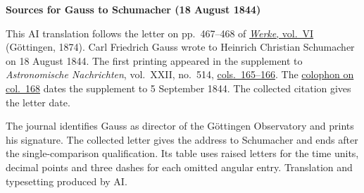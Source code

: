 \clearpage\thispagestyle{empty}
\begin{center}\textbf{Sources for Gauss to Schumacher (18 August 1844)}\end{center}
\noindent This AI translation follows the letter on pp.~467--468 of \href{https://gdz.sub.uni-goettingen.de/id/PPN236007467}{\textit{Werke}, vol.~VI} (Göttingen, 1874). Carl Friedrich Gauss wrote to Heinrich Christian Schumacher on 18 August 1844. The first printing appeared in the supplement to \textit{Astronomische Nachrichten}, vol.~XXII, no.~514, \href{https://api.digitale-sammlungen.de/iiif/image/v2/bsb10049447_00091/full/1800,/0/default.jpg}{cols.~165--166}. The \href{https://api.digitale-sammlungen.de/iiif/image/v2/bsb10049447_00092/full/1800,/0/default.jpg}{colophon on col.~168} dates the supplement to 5 September 1844. The collected citation gives the letter date.
\par\smallskip\noindent The journal identifies Gauss as director of the Göttingen Observatory and prints his signature. The collected letter gives the address to Schumacher and ends after the single-comparison qualification. Its table uses raised letters for the time units, decimal points and three dashes for each omitted angular entry. Translation and typesetting produced by AI.
\clearpage
